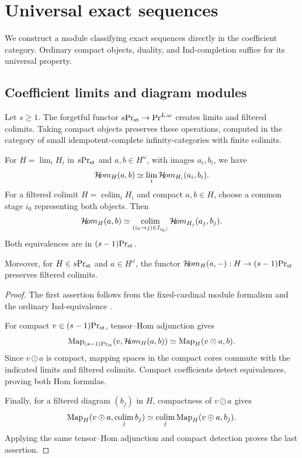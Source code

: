 \section{Universal exact sequences}
\label{sec:compact-classifiers}\label{sec:weights}

We construct a module classifying exact sequences
directly in the coefficient category.
Ordinary compact objects, duality, and Ind-completion
suffice for its universal property.

\subsection{Coefficient limits and diagram modules}


\begin{lemma}
\label{lem:compact-coefficient-homs}
\label{lem:compact-hom-filtered}
Let $s\geq1$. The forgetful functor
${s}\mathrm{Pr}_{\mathrm{st}}\to\mathrm{Pr}^{L,\omega}$ creates limits and filtered colimits.
Taking compact objects preserves these operations,
computed in the category of small idempotent-complete
infinity-categories with finite colimits.

For $H=\lim_i H_i$ in ${s}\mathrm{Pr}_{\mathrm{st}}$ and $a,b\in H^\omega$,
with images $a_i,b_i$, we have
\[
 \mathcal{H}\!om_H(a,b)
 \simeq\lim_i\mathcal{H}\!om_{H_i}(a_i,b_i).
\]
For a filtered colimit $H=\operatorname*{colim}_i H_i$
and compact $a,b\in H$, choose a common stage $i_0$
representing both objects. Then
\[
 \mathcal{H}\!om_H(a,b)
 \simeq
 \operatorname*{colim}_{(i_0\to j)\in I_{i_0/}}
 \mathcal{H}\!om_{H_j}(a_j,b_j).
\]
Both equivalences are in ${(s-1)}\mathrm{Pr}_{\mathrm{st}}$.

Moreover, for $H\in{s}\mathrm{Pr}_{\mathrm{st}}$ and $a\in H^\omega$,
the functor
$\mathcal{H}\!om_H(a,-):H\to{(s-1)}\mathrm{Pr}_{\mathrm{st}}$
preserves filtered colimits.
\end{lemma}

\begin{proof}
The first assertion follows from the fixed-cardinal
module formalism \citep[Section~2.1]{Aoki}
and the ordinary Ind-equivalence \citep{LurieHTT}.

For compact $v\in{(s-1)}\mathrm{Pr}_{\mathrm{st}}$, tensor--Hom
adjunction gives
\begin{equation}\label{eq:fnd-compact-hom-test}
 \operatorname{Map}_{{(s-1)}\mathrm{Pr}_{\mathrm{st}}}(v,\mathcal{H}\!om_H(a,b))
 \simeq\operatorname{Map}_H(v\odot a,b).
\end{equation}
Since $v\odot a$ is compact, mapping spaces in
the compact cores commute with the indicated
limits and filtered colimits. Compact coefficients
detect equivalences, proving both Hom formulas.

Finally, for a filtered diagram $(b_j)$ in $H$,
compactness of $v\odot a$ gives
\[
 \operatorname{Map}_H(v\odot a,\operatorname*{colim}_j b_j)
 \simeq\operatorname*{colim}_j\operatorname{Map}_H(v\odot a,b_j).
\]
Applying the same tensor--Hom adjunction and
compact detection proves the last assertion.
\end{proof}








